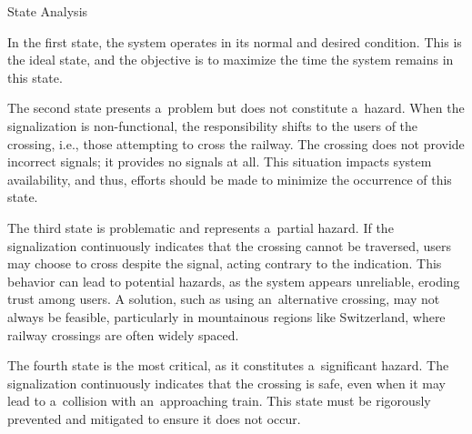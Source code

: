 \secc State Analysis

In the {\sbf first state}, the system operates in its normal and desired condition. This is the ideal state, and the objective is to maximize the time the system remains in this state.

The {\sbf second state} presents a~problem but does not constitute a~hazard. When the signalization is non-functional, the responsibility shifts to the users of the crossing, i.e., those attempting to cross the railway. The crossing does not provide incorrect signals; it provides no signals at all. This situation impacts system availability, and thus, efforts should be made to minimize the occurrence of this state.

The {\sbf third state} is problematic and represents a~partial hazard. If the signalization continuously indicates that the crossing cannot be traversed, users may choose to cross despite the signal, acting contrary to the indication. This behavior can lead to potential hazards, as the system appears unreliable, eroding trust among users. A solution, such as using an~alternative crossing, may not always be feasible, particularly in mountainous regions like Switzerland, where railway crossings are often widely spaced.

The {\sbf fourth state} is the most critical, as it constitutes a~significant hazard. The signalization continuously indicates that the crossing is safe, even when it may lead to a~collision with an~approaching train. This state must be rigorously prevented and mitigated to ensure it does not occur.